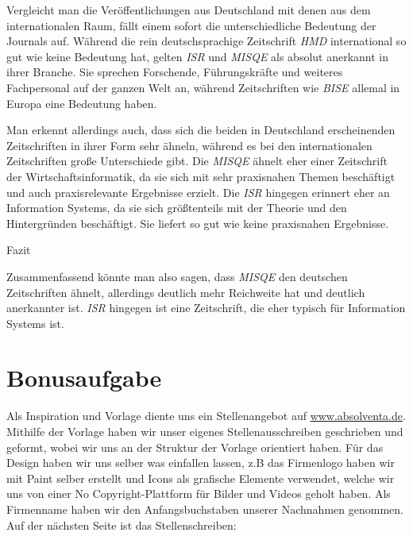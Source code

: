 \documentclass[12pt,utf8]{scrartcl}
\begin{document}
\begin{flushleft}
Vergleicht man die Veröffentlichungen aus Deutschland mit denen aus dem internationalen Raum, fällt einem sofort die unterschiedliche Bedeutung der Journals auf. Während die rein deutschsprachige Zeitschrift \emph{HMD} international so gut wie keine Bedeutung hat, gelten \emph{ISR} und \emph{MISQE} als absolut anerkannt in ihrer Branche. Sie sprechen Forschende, Führungskräfte und weiteres Fachpersonal auf der ganzen Welt an, während Zeitschriften wie \emph{BISE} allemal in Europa eine Bedeutung haben\cite{VHBJ}. 

Man erkennt allerdings auch, dass sich die beiden in Deutschland erscheinenden Zeitschriften in ihrer Form sehr ähneln, während es bei den internationalen Zeitschriften große Unterschiede gibt. Die \emph{MISQE} ähnelt eher einer Zeitschrift der Wirtschaftsinformatik, da sie  sich mit sehr praxisnahen Themen beschäftigt und auch praxisrelevante Ergebnisse erzielt. Die \emph{ISR} hingegen erinnert eher an Information Systems, da sie sich größtenteils mit der Theorie und den Hintergründen beschäftigt. Sie liefert so gut wie keine praxisnahen Ergebnisse. 
\newline

{\Large Fazit}

Zusammenfassend könnte man also sagen, dass \emph{MISQE} den deutschen Zeitschriften ähnelt, allerdings deutlich mehr Reichweite hat und deutlich anerkannter ist. \emph{ISR} hingegen ist eine Zeitschrift, die eher typisch für Information Systems ist.

\section*{\label{sec:bonus}Bonusaufgabe}

Als Inspiration und Vorlage diente uns ein Stellenangebot auf \href{https://www.absolventa.de/stellenangebote/289852-p-junior-it-consultant-m-w-business-intelligence#external-job-offer}{www.absolventa.de}\cite{online1}. Mithilfe der Vorlage haben wir unser eigenes Stellenausschreiben geschrieben und geformt, wobei wir uns an der Struktur der Vorlage orientiert haben. Für das Design haben wir uns selber was einfallen lassen, z.B das Firmenlogo haben wir mit Paint selber erstellt und Icons als grafische Elemente verwendet, welche wir uns von einer No Copyright-Plattform für Bilder und Videos geholt haben\cite{online2}. Als Firmenname haben wir den Anfangsbuchstaben unserer Nachnahmen genommen. Auf der nächsten Seite ist das Stellenschreiben:


\end{flushleft}
\end{document}

